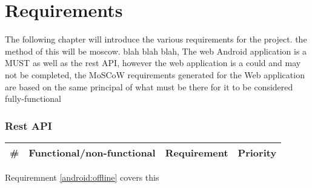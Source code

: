 \section{Requirements}
The following chapter will introduce the various requirements for the project. the method of this will be moscow. blah blah blah, The web Android application is a MUST as well as the rest API, however the web application is a could and may not be completed, the MoSCoW requirements generated for the Web application are based on the same principal of what must be there for it to be considered fully-functional

{\renewcommand{\arraystretch}{1.5}}%
\subsubsection{Rest API}

	\begin{tabular}{| p{} | p{} | p{} | p{}|}
		\hline
		\# & Functional/non-functional & Requirement & Priority\\\hline
	\end{tabular}

Requiremnent \ref{android:offline} covers this
